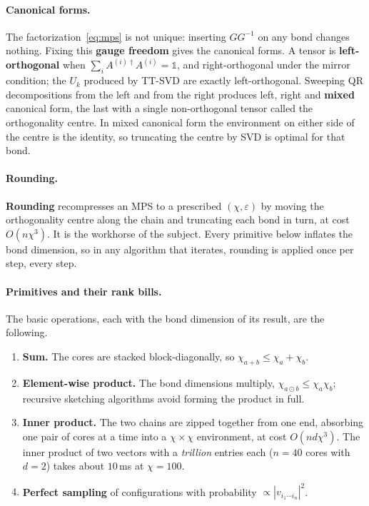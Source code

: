 \paragraph{Canonical forms.}
The factorization~\eqref{eq:mps} is not unique: inserting $G G^{-1}$ on any
bond changes nothing. Fixing this \textbf{gauge freedom} gives the canonical
forms. A tensor is \textbf{left-orthogonal} when
$\sum_{i} A^{(i)\dagger} A^{(i)} = \mathbb{1}$, and right-orthogonal under the
mirror condition; the $U_k$ produced by TT-SVD are exactly left-orthogonal.
Sweeping QR decompositions from the left and from the right produces left,
right and \textbf{mixed} canonical form, the last with a single
non-orthogonal tensor called the orthogonality centre. In mixed canonical form
the environment on either side of the centre is the identity, so truncating the
centre by SVD is optimal for that bond.

\paragraph{Rounding.}
\textbf{Rounding} recompresses an MPS to a prescribed $(\chi,\varepsilon)$ by
moving the orthogonality centre along the chain and truncating each bond in
turn, at cost $O(n\chi^3)$. It is the workhorse of the subject. Every primitive
below inflates the bond dimension, so in any algorithm that iterates, rounding
is applied once per step, every step.

\paragraph{Primitives and their rank bills.}
The basic operations, each with the bond dimension of its result, are the
following.
\begin{enumerate}
  \item \textbf{Sum.} The cores are stacked block-diagonally, so
    $\chi_{a+b} \le \chi_a + \chi_b$.
  \item \textbf{Element-wise product.} The bond dimensions multiply,
    $\chi_{a\odot b} \le \chi_a\chi_b$; recursive sketching algorithms avoid
    forming the product in full.
  \item \textbf{Inner product.} The two chains are zipped together from one
    end, absorbing one pair of cores at a time into a $\chi\times\chi$
    environment, at cost $O(n d\chi^3)$. The inner product of two vectors with a
    \emph{trillion} entries each ($n=40$ cores with $d=2$) takes about
    $10\,$ms at $\chi = 100$.
  \item \textbf{Perfect sampling} of configurations with probability
    $\propto |v_{i_1\cdots i_n}|^2$.
\end{enumerate}

